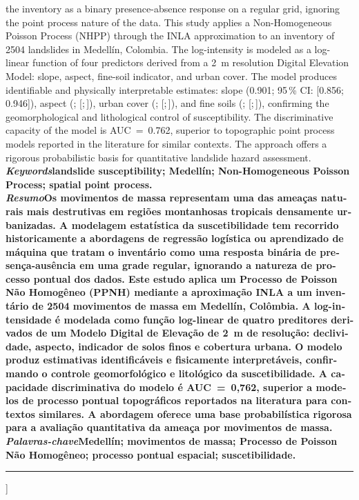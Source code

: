 \documentclass[10pt, twocolumn, letterpaper]{article}
\begin{document}
{{{{    the inventory as a binary presence-absence response on a regular grid,
    ignoring the point process nature of the data. This study applies a
    Non-Homogeneous Poisson Process (NHPP) through the INLA approximation
    to an inventory of \num{2504} landslides in Medellín, Colombia. The
    log-intensity is modeled as a log-linear function of four predictors
    derived from a \SI{2}{m} resolution Digital Elevation Model: slope,
    aspect, fine-soil indicator, and urban cover. The model produces
    identifiable and physically interpretable estimates: slope
    (0.901; 95\,\% CI: [0.856;\,0.946]), aspect
    (; [;\,]), urban cover
    (; [;\,]), and fine soils
    (; [;\,]), confirming the
    geomorphological and lithological control of susceptibility. The
    discriminative capacity of the model is AUC~=~0.762, superior to
    topographic point process models reported in the literature for similar
    contexts. The approach offers a rigorous probabilistic basis for
    quantitative landslide hazard assessment.}\\[3pt]
    \textbf{\textit{Keywords}}\textemdash\textbf{landslide susceptibility;
    Medellín; Non-Homogeneous Poisson Process; spatial point process.}}\\[3pt]
    \foreignlanguage{portuguese}{%
    \textbf{\textit{Resumo}}\textemdash\textbf{Os movimentos de massa
    representam uma das ameaças naturais mais destrutivas em regiões
    montanhosas tropicais densamente urbanizadas. A modelagem estatística
    da suscetibilidade tem recorrido historicamente a abordagens de
    regressão logística ou aprendizado de máquina que tratam o inventário
    como uma resposta binária de presença-ausência em uma grade regular,
    ignorando a natureza de processo pontual dos dados. Este estudo aplica
    um Processo de Poisson Não Homogêneo (PPNH) mediante a aproximação INLA
    a um inventário de \num{2504} movimentos de massa em Medellín, Colômbia.
    A log-intensidade é modelada como função log-linear de quatro preditores
    derivados de um Modelo Digital de Elevação de \SI{2}{m} de resolução:
    declividade, aspecto, indicador de solos finos e cobertura urbana. O
    modelo produz estimativas identificáveis e fisicamente interpretáveis,
    confirmando o controle geomorfológico e litológico da suscetibilidade.
    A capacidade discriminativa do modelo é AUC~=~0,762, superior a
    modelos de processo pontual topográficos reportados na literatura para
    contextos similares. A abordagem oferece uma base probabilística rigorosa
    para a avaliação quantitativa da ameaça por movimentos de massa.}\\[3pt]
    \textbf{\textit{Palavras-chave}}\textemdash\textbf{Medellín; movimentos
    de massa; Processo de Poisson Não Homogêneo; processo pontual espacial;
    suscetibilidade.}}%
  }%
  \vspace{3pt}
  \noindent\rule{\linewidth}{0.4pt}
  \vspace{8pt}
}]
\end{document}
